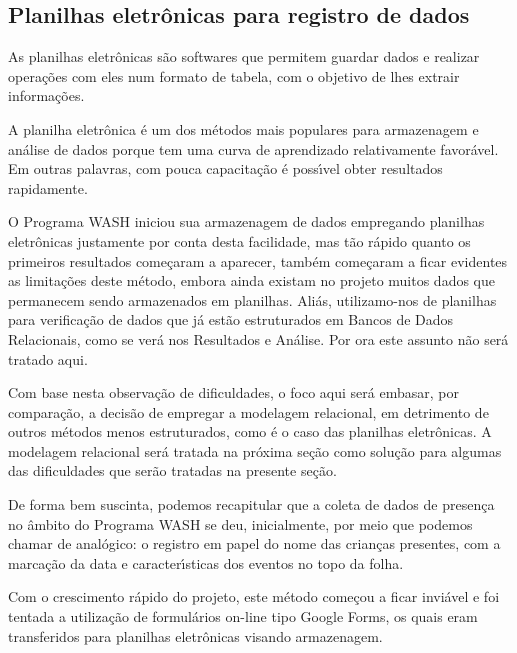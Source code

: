 \documentclass[
12pt,		%
openright,	%
twoside,  %
a4paper,			%
chapter=TITLE,		%
english,			%
french,				%
spanish,			%
brazil				%
]{USPSC-classe/USPSC}
\begin{document}
\subsection[Planilhas eletr\^onicas para registro de dados]{Planilhas eletr\^onicas para registro de dados}\label{Planilhas eletr\^onicas para registro de dados}
As planilhas eletr\^onicas s\~ao softwares que permitem guardar  dados e realizar opera\c{c}\~oes com eles num formato de tabela, com o objetivo de lhes extrair informa\c{c}\~oes.




A planilha eletr\^onica \'e um dos m\'etodos mais populares para armazenagem e an\'alise de dados porque tem uma curva de aprendizado relativamente favor\'avel. Em outras palavras, com pouca capacita\c{c}\~ao \'e poss\'{\i}vel obter resultados rapidamente.




O Programa WASH iniciou sua armazenagem de dados empregando planilhas eletr\^onicas justamente por conta desta facilidade, mas t\~ao r\'apido quanto os primeiros resultados come\c{c}aram a aparecer, tamb\'em come\c{c}aram a ficar evidentes as limita\c{c}\~oes deste m\'etodo, embora ainda existam no projeto muitos dados que permanecem sendo armazenados em planilhas. Ali\'as, utilizamo-nos de planilhas para verifica\c{c}\~ao de dados que j\'a est\~ao estruturados em Bancos de Dados Relacionais, como se ver\'a nos Resultados e An\'alise. Por ora este assunto n\~ao ser\'a tratado aqui.




Com base nesta observa\c{c}\~ao de dificuldades, o foco aqui ser\'a embasar, por compara\c{c}\~ao, a decis\~ao de empregar a modelagem relacional, em detrimento de outros m\'etodos menos estruturados, como \'e o caso das planilhas eletr\^onicas. A modelagem relacional ser\'a tratada na pr\'oxima se\c{c}\~ao como solu\c{c}\~ao para algumas das dificuldades que ser\~ao tratadas na presente se\c{c}\~ao.




De forma bem suscinta, podemos recapitular que a coleta de dados de presen\c{c}a no \^ambito do Programa WASH se deu, inicialmente, por meio que podemos chamar de anal\'ogico: o registro em papel do nome das crian\c{c}as presentes, com a marca\c{c}\~ao da data e caracter\'{\i}sticas dos eventos no topo da folha.




Com o crescimento r\'apido do projeto, este m\'etodo come\c{c}ou a ficar invi\'avel e foi tentada a utiliza\c{c}\~ao de formul\'arios on-line tipo \textquotedbl Google Forms\textquotedbl , os quais eram transferidos para planilhas eletr\^onicas visando armazenagem.
\end{document}
